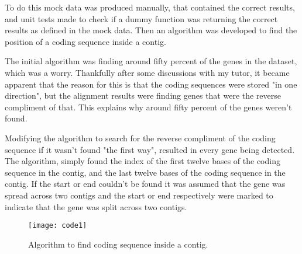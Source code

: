 To do this mock data was produced manually, that contained the correct results, and unit tests made to check if a dummy function was returning the correct results as defined in the mock data. Then an algorithm was developed to find the position of a coding sequence inside a contig. 

The initial algorithm was finding around fifty percent of the genes in the dataset, which was a worry. Thankfully after some discussions with my tutor, it became apparent that the reason for this is that the coding sequences were stored "in one direction", but the alignment results were finding genes that were the reverse compliment of that. This explains why around fifty percent of the genes weren't found. 

Modifying the algorithm to search for the reverse compliment of the coding sequence if it wasn't found "the first way", resulted in every gene being detected. The algorithm, simply found the index of the first twelve bases of the coding sequence in the contig, and the last twelve bases of the coding sequence in the contig. If the start or end couldn't be found it was assumed that the gene was spread across two contigs and the start or end respectively were marked to indicate that the gene was split across two contigs. 

\begin{figure}[ht!]
\begin{center}
\texttt{[image: code1]}
\caption{Algorithm to find coding sequence inside a contig. \label{overflow}}
\end{center}
\end{figure}

% 
% 
% 


